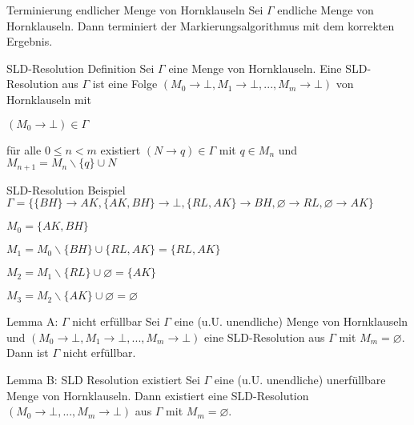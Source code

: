 \documentclass[avery5371]{flashcards}
\begin{document}
\begin{flashcard}[ Erfüllbarkeit ]{ Terminierung endlicher Menge von Hornklauseln }
    Sei $\Gamma$ endliche Menge von Hornklauseln. Dann terminiert der Markierungsalgorithmus mit dem korrekten Ergebnis.
\end{flashcard}

\begin{flashcard}[ Erfüllbarkeit ]{ SLD-Resolution Definition }
    Sei $\Gamma$ eine Menge von Hornklauseln. Eine SLD-Resolution aus $\Gamma$ ist eine Folge $(M_0\rightarrow\bot,M_1\rightarrow\bot,... ,M_m\rightarrow\bot)$ von Hornklauseln mit
    \begin{itemize*}
        \item $(M_0\rightarrow\bot)\in\Gamma$
        \item für alle $0\leq n<m$ existiert $(N\rightarrow q)\in\Gamma$ mit $q\in M_n$ und $M_{n+1} = M_n\backslash\{q\}\cup N$
    \end{itemize*}
\end{flashcard}

\begin{flashcard}[ Erfüllbarkeit ]{ SLD-Resolution Beispiel \newline $\Gamma =\{\{BH\}\rightarrow AK,\{AK,BH\}\rightarrow\bot,\{RL,AK\}\rightarrow BH,\varnothing\rightarrow RL,\varnothing\rightarrow AK\}$}
    \begin{itemize*}
        \item $M_0 =\{AK,BH\}$
        \item $M_1 =M_0 \backslash\{BH\}\cup\{RL,AK\}=\{RL,AK\}$
        \item $M_2 =M_1 \backslash\{RL\}\cup\varnothing =\{AK\}$
        \item $M_3 =M_2 \backslash\{AK\}\cup\varnothing =\varnothing$
    \end{itemize*}
\end{flashcard}

\begin{flashcard}[ Erfüllbarkeit ]{ Lemma A: $\Gamma$ nicht erfüllbar }
    Sei $\Gamma$ eine (u.U. unendliche) Menge von Hornklauseln und $(M_0\rightarrow\bot, M_1\rightarrow\bot,... , M_m\rightarrow\bot)$ eine SLD-Resolution aus $\Gamma$ mit $M_m=\varnothing$. Dann ist $\Gamma$ nicht erfüllbar.
\end{flashcard}

\begin{flashcard}[ Erfüllbarkeit ]{ Lemma B: SLD Resolution existiert }
    Sei $\Gamma$ eine (u.U. unendliche) unerfüllbare Menge von Hornklauseln. Dann existiert eine SLD-Resolution $(M_0\rightarrow\bot,...,M_m\rightarrow\bot)$ aus $\Gamma$ mit $M_m=\varnothing$.
\end{flashcard}
\end{document}
